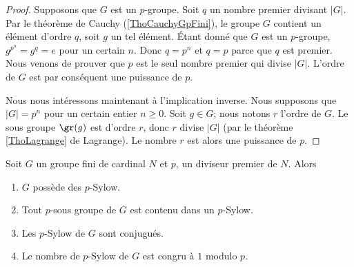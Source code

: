 \begin{proof}
    Supposons que \( G\) est un $p$-groupe. Soit \( q\) un nombre premier divisant \( | G |\). Par le théorème de Cauchy (\ref{ThoCauchyGpFini}), le groupe \( G\) contient un élément d'ordre \( q\), soit \( g\) un tel élément. Étant donné que \( G\) est un $p$-groupe, \( g^{p^n}=g^q=e\) pour un certain \( n\). Donc $q=p^n$ et \( q=p\) parce que \( q\) est premier. Nous venons de prouver que \( p\) est le seul nombre premier qui divise \( | G |\). L'ordre de \( G\) est par conséquent une puissance de \( p\).

    Nous nous intéressons maintenant à l'implication inverse. Nous supposons que \( | G |=p^n\) pour un certain entier \( n\geq 0\). Soit \( g\in G\); nous notons \( r\) l'ordre de \( G\). Le sous groupe \( \gr(g)\) est d'ordre \( r\), donc \( r\) divise \( | G |\) (par le théorème \ref{ThoLagrange} de Lagrange). Le nombre \( r\) est alors une puissance de \( p\).
\end{proof}


\begin{theorem}
    Soit \( G\) un groupe fini de cardinal \( N\) et \( p\), un diviseur premier de \( N\). Alors
    \begin{enumerate}
        \item
            \( G\) possède des \( p\)-Sylow.
        \item
            Tout \( p\)-sous groupe de \( G\) est contenu dans un \( p\)-Sylow.
        \item
            Les \( p\)-Sylow de \( G\) sont conjugués.
        \item
            Le nombre de \( p\)-Sylow de \( G\) est congru à \( 1\) modulo \( p\).
    \end{enumerate}
\end{theorem}

